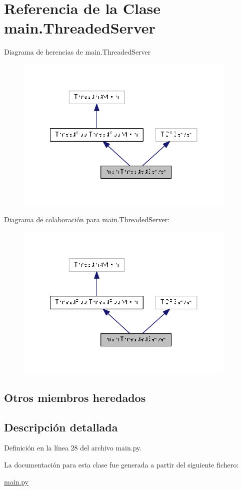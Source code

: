 \hypertarget{classmain_1_1_threaded_server}{\section{Referencia de la Clase main.\-Threaded\-Server}
\label{classmain_1_1_threaded_server}
}


Diagrama de herencias de main.\-Threaded\-Server\nopagebreak
\begin{figure}[H]
\begin{center}
\leavevmode
\includegraphics[width=299pt]{classmain_1_1_threaded_server__inherit__graph}
\end{center}
\end{figure}


Diagrama de colaboración para main.\-Threaded\-Server\-:\nopagebreak
\begin{figure}[H]
\begin{center}
\leavevmode
\includegraphics[width=299pt]{classmain_1_1_threaded_server__coll__graph}
\end{center}
\end{figure}
\subsection*{Otros miembros heredados}


\subsection{Descripción detallada}


Definición en la línea 28 del archivo main.\-py.



La documentación para esta clase fue generada a partir del siguiente fichero\-:\begin{DoxyCompactItemize}
\item 
\hyperlink{main_8py}{main.\-py}\end{DoxyCompactItemize}
